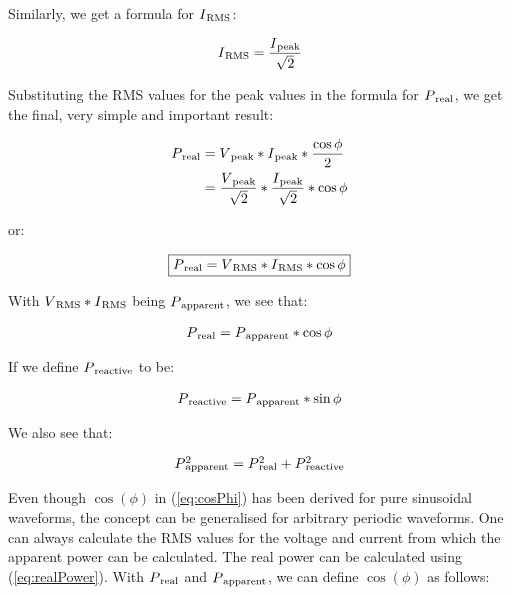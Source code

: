 \documentclass[a4paper]{article}
\def\SB#1{\textsubscript{{#1}}}
\def\SPSB#1#2{\rlap{\textsuperscript{#1}}\SB{#2}}
\begin{document}
Similarly, we get a formula for $I\SB{RMS}$:

\begin{align*}
  I\SB{RMS} &= \frac{I\SB{peak}}{\sqrt{2}}\\
\end{align*}

Substituting the RMS values for the peak values in the formula for
$P\SB{real}$, we get the final, very simple and important result:

\begin{equation*}
  \begin{aligned}
  P\SB{real} &= V\SB{peak} * I\SB{peak} * \frac{\cos{\phi}}{2}\\
  &= \frac{V\SB{peak}}{\sqrt{2}} * \frac{I\SB{peak}}{\sqrt{2}} * \cos{\phi}\\
  \end{aligned}
\end{equation*}

or:

\begin{equation} \label{eq:cosPhi}
   \boxed{
	P\SB{real} = V\SB{RMS} * I\SB{RMS} * \cos{\phi} \\
   }
\end{equation}

With $V\SB{RMS} * I\SB{RMS}$ being $P\SB{apparent}$, we  see that:

\begin{align*}
  P\SB{real} &= P\SB{apparent} * \cos{\phi} \\
\end{align*}

If we define $P\SB{reactive}$ to be:

\begin{align*}
  P\SB{reactive} &= P\SB{apparent} * \sin{\phi} \\
\end{align*}

We also see that:

\begin{align*}
  P\SPSB{2}{apparent} &= P\SPSB{2}{real} + P\SPSB{2}{reactive} \\
\end{align*}

Even though $\cos(\phi)$ in (\ref{eq:cosPhi}) has been derived for pure
sinusoidal waveforms, the concept can be generalised for arbitrary
periodic waveforms. One can always calculate the RMS values for the
voltage and current from which the apparent power can be calculated.
The real power can be calculated using (\ref{eq:realPower}). With $P\SB{real}$
and $P\SB{apparent}$, we can define $\cos(\phi)$ as follows:
\end{document}
